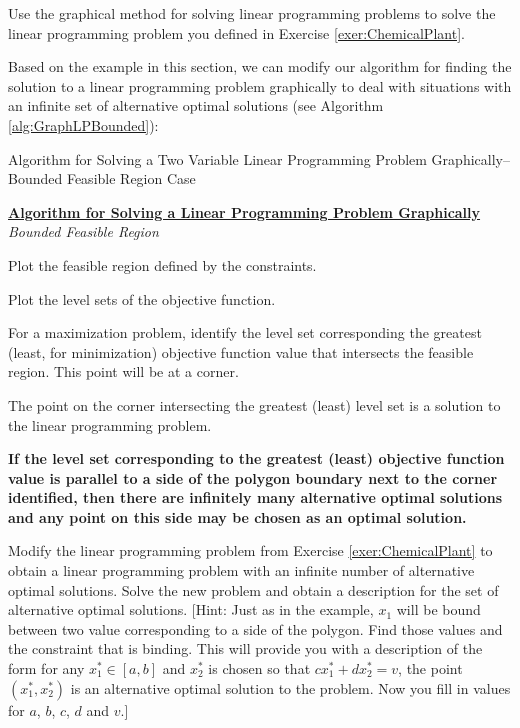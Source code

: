 \begin{exercise}{}{} Use the graphical method for solving linear programming problems to solve the linear programming problem you defined in Exercise \ref{exer:ChemicalPlant}.
\end{exercise}



Based on the example in this section, we can modify our algorithm for finding the solution to a linear programming problem graphically to deal with situations with an infinite set of alternative optimal solutions (see Algorithm \ref{alg:GraphLPBounded}):
\begin{algorithm}[H]
\caption{Algorithm for Solving a Two Variable Linear Programming Problem Graphically--Bounded Feasible Region Case}
\label{alg:GraphLPBounded}
\begin{center}
\begin{minipage}[t]{\textwidth-1em}
\underline{\textbf{Algorithm for Solving a Linear Programming Problem Graphically}}\\
\textit{Bounded Feasible Region}
\begin{enumerate*}
\item Plot the feasible region defined by the constraints.
\item Plot the level sets of the objective function.
\item For a maximization problem, identify the level set corresponding the greatest (least, for minimization) objective function value that intersects the feasible region. This point will be at a corner. 
\item The point on the corner intersecting the greatest (least) level set is a solution to the linear programming problem. 
\item \textbf{If the level set corresponding to the greatest (least) objective function value is parallel to a side of the polygon boundary next to the corner identified, then there are infinitely many alternative optimal solutions and any point on this side may be chosen as an optimal solution.} 
\end{enumerate*}
\end{minipage}
\end{center}
\end{algorithm}

\begin{exercise}{}{} Modify the linear programming problem from Exercise \ref{exer:ChemicalPlant} to obtain a linear programming problem with an infinite number of alternative optimal solutions. Solve the new problem and obtain a description for the set of alternative optimal solutions. [Hint: Just as in the example, $x_1$ will be bound between two value corresponding to a side of the polygon. Find those values and the constraint that is binding. This will provide you with a description of the form for any $x_1^* \in [a,b]$ and $x_2^*$ is chosen so that $cx_1^* + dx_2^* = v$, the point $(x_1^*, x_2^*)$ is an alternative optimal solution to the problem. Now you fill in values for $a$, $b$, $c$, $d$ and $v$.]
\end{exercise}

